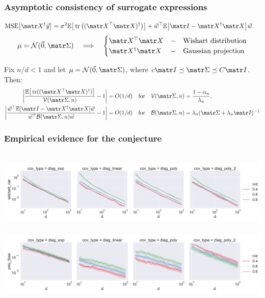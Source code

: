 \begin{frame}
  \frametitle{Asymptotic consistency of surrogate expressions}
  \begin{align*}
  \MSE{\X^\dagger\y}
  &=\sigma^2\E\big[\tr\big((\X^\top\X)^\dagger\big)\big] +
    \w^{\top}\E\big[\I-\X^\dagger\X\big]\w.
  \end{align*}
  \begin{align*}
    \mu=\Nc(\vec{0},\Sigmab)\quad \Longrightarrow\quad
    \begin{cases}
      \X^\top\X&-\quad\text{Wishart distribution}\\
      \X^\dagger\X&-\quad\text{Gaussian projection}
    \end{cases}
  \end{align*}
  \pause
  \begin{conjecture}
  Fix $n/d<1$ and let $\mu=\Nc(\vec{0},\Sigmab )$, where 
  $c\I\preceq\Sigmab\preceq C\I$. Then:
\begin{align*}
\bigg|\frac{\E\big[\tr((\X^\top\X)^\dagger)\big]}{\Vc(\Sigmab,n)} -1\bigg|&=
  O(1/d)\quad\text{for}\quad\Vc(\Sigmab,n)=\frac{1-\alpha_n}{\lambda_n},\\
  \bigg|\frac{\w^\top\E[\I-\X^\dagger\X]\w}{\w^\top
  \Bc(\Sigmab,n)\w} - 1\bigg| &= O(1/d)\quad\text{for}\quad
  \Bc(\Sigmab,n) = \lambda_n(\Sigmab+\lambda_n\I)^{-1}
\end{align*}
\end{conjecture}
\end{frame}

\begin{frame}
  \frametitle{Empirical evidence for the conjecture}
~\hspace{-1cm}\includegraphics[width=1.16\textwidth]{Figures/descent/wishart_var.pdf}\\
~\hspace{-1cm}\includegraphics[width=1.16\textwidth]{Figures/descent/proj_bias.pdf}
\end{frame}

